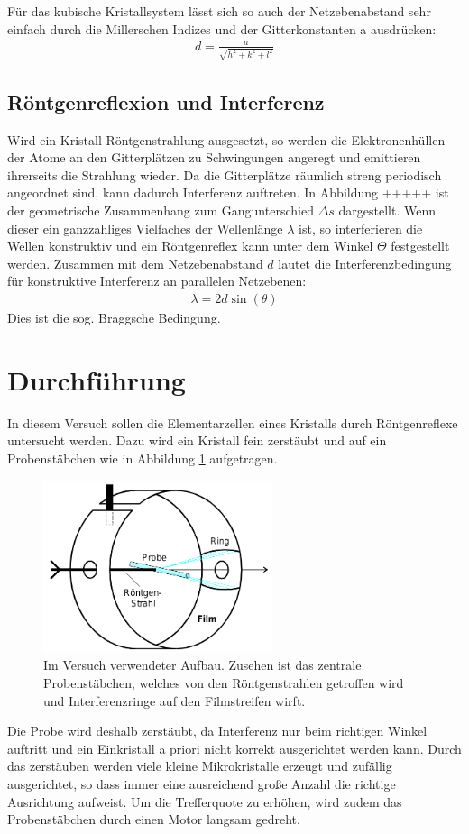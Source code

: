 Für das kubische Kristallsystem lässt sich so auch der Netzebenabstand sehr einfach durch die Millerschen Indizes und der Gitterkonstanten a ausdrücken:
\begin{align}
d = \frac{a}{\sqrt{h^2 + k^2 + l^2}}
\label{eq:gapMiller}
\end{align}

\subsection{Röntgenreflexion und Interferenz}
Wird ein Kristall Röntgenstrahlung ausgesetzt, so werden die Elektronenhüllen der Atome an den Gitterplätzen zu Schwingungen angeregt und emittieren ihrerseits die Strahlung wieder. Da die Gitterplätze räumlich streng periodisch angeordnet sind, kann dadurch Interferenz auftreten. In Abbildung +++++ ist der geometrische Zusammenhang zum Gangunterschied $\Delta s$ dargestellt. Wenn dieser ein ganzzahliges Vielfaches der Wellenlänge $\lambda$ ist, so interferieren die Wellen konstruktiv und ein Röntgenreflex kann unter dem Winkel $\Theta$ festgestellt werden. Zusammen mit dem Netzebenabstand $d$ lautet die Interferenzbedingung für konstruktive Interferenz an parallelen Netzebenen:
\begin{align}
 \lambda = 2 d \sin(\theta)
 \label{eq:bragg}
\end{align}
Dies ist die sog. Braggsche Bedingung.

\section{Durchführung}
In diesem Versuch sollen die Elementarzellen eines Kristalls durch Röntgenreflexe untersucht werden. Dazu wird ein Kristall fein zerstäubt und auf ein Probenstäbchen wie in Abbildung \ref{pic:aufbau} aufgetragen.
\begin{figure}[htbp]
	\includegraphics[width=0.6\textwidth]{../pics/aufbau.png}
	\caption{Im Versuch verwendeter Aufbau. Zusehen ist das zentrale Probenstäbchen, welches von den Röntgenstrahlen getroffen wird und Interferenzringe auf den Filmstreifen wirft.}
	\label{pic:aufbau}
\end{figure}
Die Probe wird deshalb zerstäubt, da Interferenz nur beim richtigen Winkel auftritt und ein Einkristall a priori nicht korrekt ausgerichtet werden kann. Durch das zerstäuben werden viele kleine Mikrokristalle erzeugt und zufällig ausgerichtet, so dass immer eine ausreichend große Anzahl die richtige Ausrichtung aufweist. Um die Trefferquote zu erhöhen, wird zudem das Probenstäbchen durch einen Motor langsam gedreht. 

